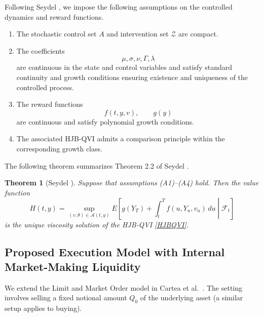 \documentclass[12pt]{article}
\newtheorem{theorem}[thm]{Theorem}
\begin{document}
Following Seydel \cite{seydel2009existence},
we impose the following assumptions on the controlled dynamics and reward functions.

\begin{enumerate}
\item[(A1)]
The stochastic control set $A$ and intervention set $\mathcal Z$ are compact.

\item[(A2)]
The coefficients
\[
\mu,\sigma,\nu,\Gamma,\lambda
\]
are continuous in the state and control variables and satisfy standard continuity and growth conditions ensuring existence and uniqueness of the controlled process.

\item[(A3)]
The reward functions
\[
f(t,y,v),
\qquad
g(y)
\]
are continuous and satisfy polynomial growth conditions.

\item[(A4)]
The associated HJB-QVI admits a comparison principle within the corresponding growth class.
\end{enumerate}
The following theorem summarizes Theorem 2.2 of Seydel \cite{seydel2009existence}.
\begin{theorem}[Seydel \cite{seydel2009existence}]
\label{thm:seydel}
Suppose that assumptions (A1)--(A4) hold.
Then the value function
\[
H(t,y)
=
\sup_{(v,\theta)\in\mathcal A(t,y)}
E\left[
g(Y_T)
+
\int_t^T
f(u,Y_u,v_u)\,du
\middle|
\mathcal F_t
\right]
\]
is the unique viscosity solution of the HJB-QVI \eqref{HJBQVI}.
\end{theorem}

\subsection{Proposed Execution Model with Internal Market-Making Liquidity}
\label{sec:model_internal}

We extend the Limit and Market Order model in
Cartea et al.~\cite{cartea2015algorithmic}.
The setting involves selling a fixed notional amount $Q_0$
of the underlying asset
(a similar setup applies to buying).
\end{document}
